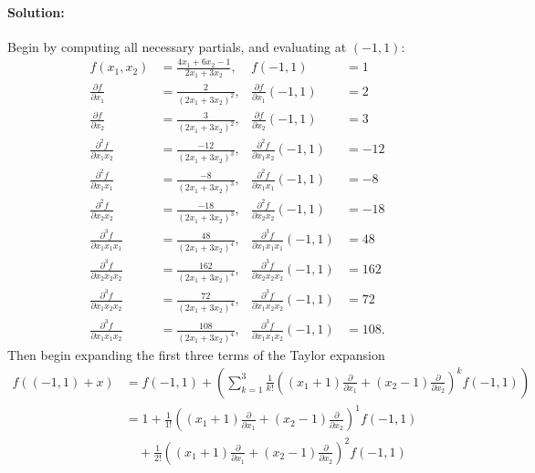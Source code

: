 \documentclass{article}
\begin{document}
\begin{enumerate}
    \paragraph{Solution: } Begin by computing all necessary partials, and evaluating at $(-1,1)$: 
    \begin{align*}
        f(x_1,x_2   )&= \frac{4x_1+6x_2-1}{2x_1+3x_2},&f(-1,1)&=1 \\
        \frac{\partial f}{\partial x_1} &= \frac{2}{(2x_1+3x_2)^2},& \frac{\partial f}{\partial x_1}(-1,1)&=2 \\
        \frac{\partial f}{\partial x_2} &= \frac{3}{(2x_1+3x_2)^2},& \frac{\partial f}{\partial x_2}(-1,1)&=3 \\
        \frac{\partial^2 f}{\partial x_1x_2} &= \frac{-12}{(2x_1+3x_2)^3},& \frac{\partial^2 f}{\partial x_1x_2}(-1,1)&=-12 \\
        \frac{\partial^2 f}{\partial x_1x_1} &= \frac{-8}{(2x_1+3x_2)^3},& \frac{\partial^2 f}{\partial x_1x_1}(-1,1)&=-8 \\
        \frac{\partial^2 f}{\partial x_2x_2} &= \frac{-18}{(2x_1+3x_2)^3},& \frac{\partial^2 f}{\partial x_2x_2}(-1,1)&=-18 \\
        \frac{\partial^3 f}{\partial x_1x_1x_1} &= \frac{48}{(2x_1+3x_2)^4},& \frac{\partial^3 f}{\partial x_1x_1x_1}(-1,1)&=48 \\
        \frac{\partial^3 f}{\partial x_2x_2x_2} &= \frac{162}{(2x_1+3x_2)^4},& \frac{\partial^3 f}{\partial x_2x_2x_2}(-1,1)&=162 \\
        \frac{\partial^3 f}{\partial x_1x_2x_2} &= \frac{72}{(2x_1+3x_2)^4},& \frac{\partial^3 f}{\partial x_1x_2x_2}(-1,1)&=72 \\
        \frac{\partial^3 f}{\partial x_1x_1x_2} &= \frac{108}{(2x_1+3x_2)^4},& \frac{\partial^3 f}{\partial x_1x_1x_2}(-1,1)&=108
    .\end{align*}
    Then begin expanding the first three terms of the Taylor expansion
    \begin{align*}
        f((-1,1)+x)&=f(-1,1)+\left(\sum\limits_{k=1}^{3}\frac{1}{k!}\left( (x_1+1)\frac{\partial }{\partial x_1} +(x_2-1)\frac{\partial }{\partial x_2}  \right) ^{k}f(-1,1)\right)\\
        &= 1+\frac{1}{1!}\left( (x_1+1)\frac{\partial }{\partial x_1} +(x_2-1)\frac{\partial }{\partial x_2}  \right) ^{1}f(-1,1)\\
        &\quad+\frac{1}{2!}\left( (x_1+1)\frac{\partial }{\partial x_1} +(x_2-1)\frac{\partial }{\partial x_2}  \right) ^{2}f(-1,1)\\

\end{align*}
\end{enumerate}
\end{document}
